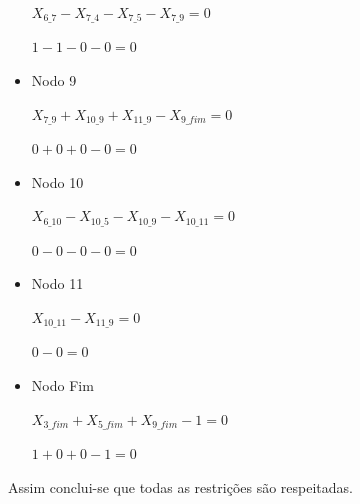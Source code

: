 \begin{itemize}
$X_{6\_7}- X_{7\_4}- X_{7\_5} - X_{7\_9} = 0$

$1 - 1 - 0 - 0 = 0$

\item Nodo 9 

$X_{7\_9} + X_{10\_9} + X_{11\_9} - X_{9\_fim} = 0$

$0 + 0 + 0 - 0 = 0$

\item Nodo 10 

$X_{6\_10} - X_{10\_5} - X_{10\_9} - X_{10\_11} = 0$

$0 - 0 - 0 - 0 = 0$

\item Nodo 11 

$X_{10\_11} - X_{11\_9} = 0$

$0 - 0 = 0$

\item Nodo Fim 

$X_{3\_fim} + X_{5\_fim} + X_{9\_fim} - 1 = 0$

$1 + 0 + 0 - 1 = 0$

\end{itemize}

Assim conclui-se que todas as restrições são respeitadas.







